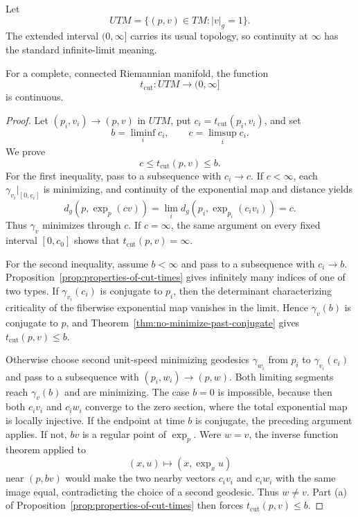 Let
\[
UTM=\{(p,v)\in TM:|v|_g=1\}.
\]
The extended interval $(0,\infty]$ carries its usual topology, so continuity at
$\infty$ has the standard infinite-limit meaning.

\begin{theorem}
\label{thm:cut-time-continuous}
For a complete, connected Riemannian manifold, the function
\[
t_{\mathrm{cut}}\colon UTM\longrightarrow(0,\infty]
\]
is continuous.

\begin{proof}
\sketch Let $(p_i,v_i)\to(p,v)$ in $UTM$, put
$c_i=t_{\mathrm{cut}}(p_i,v_i)$, and set
\[
b=\liminf_i c_i,
\qquad c=\limsup_i c_i.
\]
We prove
\[
c\leq t_{\mathrm{cut}}(p,v)\leq b.
\]
For the first inequality, pass to a subsequence with $c_i\to c$. If
$c<\infty$, each $\gamma_{v_i}|_{[0,c_i]}$ is minimizing, and continuity of
the exponential map and distance yields
\[
d_g(p,\exp_p(cv))
=\lim_i d_g(p_i,\exp_{p_i}(c_iv_i))
=c.
\]
Thus $\gamma_v$ minimizes through $c$. If $c=\infty$, the same argument on
every fixed interval $[0,c_0]$ shows that $t_{\mathrm{cut}}(p,v)=\infty$.

For the second inequality, assume $b<\infty$ and pass to a subsequence with
$c_i\to b$. Proposition~\ref{prop:properties-of-cut-times} gives infinitely
many indices of one of two types. If $\gamma_{v_i}(c_i)$ is conjugate to $p_i$,
then the determinant characterizing criticality of the fiberwise exponential
map vanishes in the limit. Hence $\gamma_v(b)$ is conjugate to $p$, and
Theorem~\ref{thm:no-minimize-past-conjugate} gives
$t_{\mathrm{cut}}(p,v)\leq b$.

Otherwise choose second unit-speed minimizing geodesics
$\gamma_{w_i}$ from $p_i$ to $\gamma_{v_i}(c_i)$ and pass to a subsequence
with $(p_i,w_i)\to(p,w)$. Both limiting segments reach $\gamma_v(b)$ and are
minimizing. The case $b=0$ is impossible, because then both $c_iv_i$ and
$c_iw_i$ converge to the zero section, where the total exponential map is
locally injective. If the endpoint at time $b$ is conjugate, the preceding
argument applies. If not, $bv$ is a regular point of $\exp_p$. Were $w=v$,
the inverse function
theorem applied to
\[
(x,u)\longmapsto(x,\exp_xu)
\]
near $(p,bv)$ would make the two nearby vectors $c_iv_i$ and $c_iw_i$ with
the same image equal, contradicting the choice of a second geodesic. Thus
$w\ne v$. Part (a) of Proposition~\ref{prop:properties-of-cut-times} then
forces $t_{\mathrm{cut}}(p,v)\leq b$.
\end{proof}
\end{theorem}

